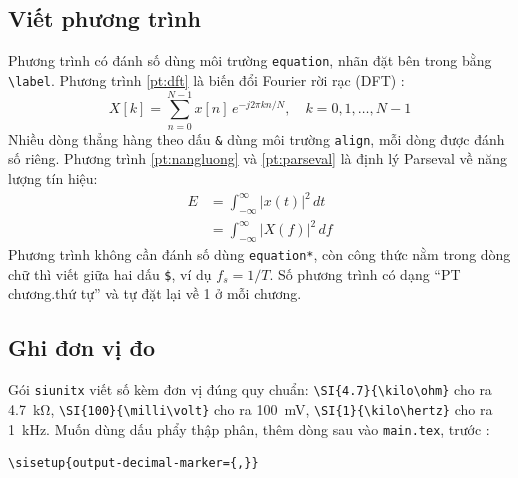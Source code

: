 \subsection{Viết phương trình}
Phương trình có đánh số dùng môi trường \texttt{equation}, nhãn đặt bên trong bằng \verb|\label|. Phương trình \ref{pt:dft} là biến đổi Fourier rời rạc (DFT) \cite{howell2016principles}:
\begin{equation}
    \label{pt:dft}
    X[k] = \sum_{n=0}^{N-1} x[n]\, e^{-j 2\pi k n / N}, \quad k = 0, 1, \dots, N-1
\end{equation}
Nhiều dòng thẳng hàng theo dấu \verb|&| dùng môi trường \texttt{align}, mỗi dòng được đánh số riêng. Phương trình \ref{pt:nangluong} và \ref{pt:parseval} là định lý Parseval về năng lượng tín hiệu:
\begin{align}
    E &= \int_{-\infty}^{\infty} |x(t)|^2 \, dt \label{pt:nangluong} \\
      &= \int_{-\infty}^{\infty} |X(f)|^2 \, df \label{pt:parseval}
\end{align}
Phương trình không cần đánh số dùng \texttt{equation*}, còn công thức nằm trong dòng chữ thì viết giữa hai dấu \verb|$|, ví dụ $f_s = 1/T$. Số phương trình có dạng ``PT chương.thứ tự'' và tự đặt lại về 1 ở mỗi chương.

\subsection{Ghi đơn vị đo}
\label{sec:donvi}
Gói \texttt{siunitx} viết số kèm đơn vị đúng quy chuẩn: \verb|\SI{4.7}{\kilo\ohm}| cho ra \SI{4.7}{\kilo\ohm}, \verb|\SI{100}{\milli\volt}| cho ra \SI{100}{\milli\volt}, \verb|\SI{1}{\kilo\hertz}| cho ra \SI{1}{\kilo\hertz}. Muốn dùng dấu phẩy thập phân, thêm dòng sau vào \texttt{main.tex}, trước \verb||:
\begin{verbatim}
\sisetup{output-decimal-marker={,}}
\end{verbatim}

